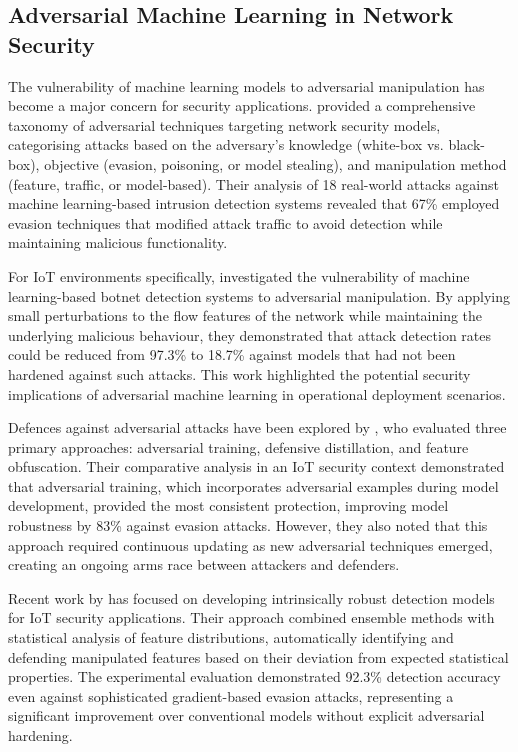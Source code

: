 \subsection{Adversarial Machine Learning in Network Security}

The vulnerability of machine learning models to adversarial manipulation has become a major concern for security applications. \cite{Corona2017} provided a comprehensive taxonomy of adversarial techniques targeting network security models, categorising attacks based on the adversary's knowledge (white-box vs. black-box), objective (evasion, poisoning, or model stealing), and manipulation method (feature, traffic, or model-based). Their analysis of 18 real-world attacks against machine learning-based intrusion detection systems revealed that 67\% employed evasion techniques that modified attack traffic to avoid detection while maintaining malicious functionality.

For IoT environments specifically, \cite{Chen2019} investigated the vulnerability of machine learning-based botnet detection systems to adversarial manipulation. By applying small perturbations to the flow features of the network while maintaining the underlying malicious behaviour, they demonstrated that attack detection rates could be reduced from 97.3\% to 18.7\% against models that had not been hardened against such attacks. This work highlighted the potential security implications of adversarial machine learning in operational deployment scenarios.

Defences against adversarial attacks have been explored by \cite{Apruzzese2019}, who evaluated three primary approaches: adversarial training, defensive distillation, and feature obfuscation. Their comparative analysis in an IoT security context demonstrated that adversarial training, which incorporates adversarial examples during model development, provided the most consistent protection, improving model robustness by 83\% against evasion attacks. However, they also noted that this approach required continuous updating as new adversarial techniques emerged, creating an ongoing arms race between attackers and defenders.

Recent work by \cite{Venkatesan2021} has focused on developing intrinsically robust detection models for IoT security applications. Their approach combined ensemble methods with statistical analysis of feature distributions, automatically identifying and defending manipulated features based on their deviation from expected statistical properties. The experimental evaluation demonstrated 92.3\% detection accuracy even against sophisticated gradient-based evasion attacks, representing a significant improvement over conventional models without explicit adversarial hardening.

